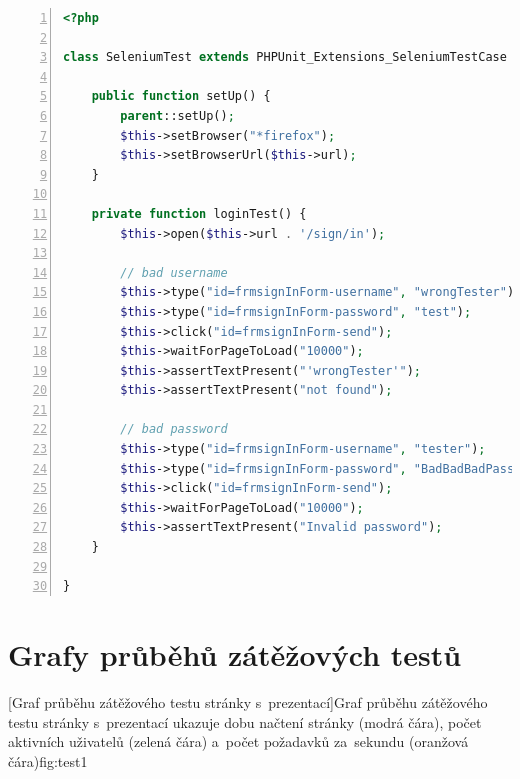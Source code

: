 \documentclass[11pt,twoside,a4paper]{book}
\begin{document}
\newpage

\begin{lstlisting}[caption={Ukázka Selenium testu},label={lst:seleniumtest},
language=php,
numbers=left,
breaklines=true]
<?php

class SeleniumTest extends PHPUnit_Extensions_SeleniumTestCase {

	public function setUp() {
		parent::setUp();
		$this->setBrowser("*firefox");
		$this->setBrowserUrl($this->url);
	}

	private function loginTest() {
		$this->open($this->url . '/sign/in');

		// bad username
		$this->type("id=frmsignInForm-username", "wrongTester");
		$this->type("id=frmsignInForm-password", "test");
		$this->click("id=frmsignInForm-send");
		$this->waitForPageToLoad("10000");
		$this->assertTextPresent("'wrongTester'");
		$this->assertTextPresent("not found");

		// bad password
		$this->type("id=frmsignInForm-username", "tester");
		$this->type("id=frmsignInForm-password", "BadBadBadPassword");
		$this->click("id=frmsignInForm-send");
		$this->waitForPageToLoad("10000");
		$this->assertTextPresent("Invalid password");
	}
	
}
\end{lstlisting}

\chapter{Grafy průběhů zátěžových testů}\label{chap:loadtest}

%
[Graf průběhu zátěžového testu stránky s~prezentací]{Graf průběhu zátěžového testu stránky s~prezentací ukazuje dobu načtení stránky (modrá čára), počet aktivních uživatelů (zelená čára) a~počet požadavků za~sekundu (oranžová čára)}{fig:test1}
\end{document}

